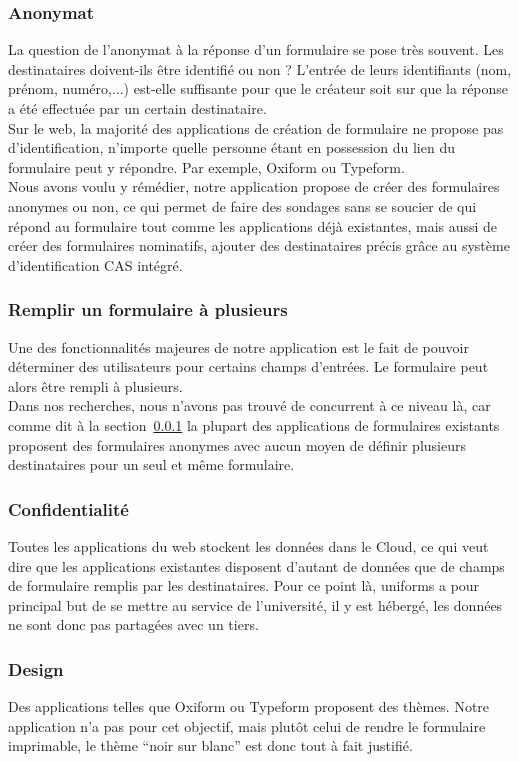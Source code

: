 \documentclass{sigplanconf}
\begin{document}
\subsubsection{Anonymat}\label{sec:anonymat}
La question de l’anonymat à la réponse d’un formulaire se pose très souvent. Les destinataires doivent-ils être identifié ou non ? L’entrée de leurs identifiants (nom, prénom, numéro,...) est-elle suffisante pour que le créateur soit sur que la réponse a été effectuée par un certain destinataire.\\
Sur le web, la majorité des applications de création de formulaire ne propose pas d’identification, n’importe quelle personne étant en possession du lien du formulaire peut y répondre. Par exemple, Oxiform ou Typeform. \\
Nous avons voulu y rémédier, notre application propose de créer des formulaires anonymes ou non, ce qui permet de faire des sondages sans se soucier de qui répond au formulaire tout comme les applications déjà existantes, mais aussi de créer des formulaires nominatifs, ajouter des destinataires précis grâce au système d’identification CAS intégré.
\subsubsection{Remplir un formulaire à plusieurs}
Une des fonctionnalités majeures de notre application est le fait de pouvoir déterminer des utilisateurs pour certains champs d'entrées. Le formulaire peut alors être rempli à plusieurs.\\
Dans nos recherches, nous n'avons pas trouvé de concurrent à ce niveau là, car comme dit à la section~\ref{sec:anonymat} la plupart des applications de formulaires existants proposent des formulaires anonymes avec aucun moyen de définir plusieurs destinataires pour un seul et même formulaire.

\subsubsection{Confidentialité}
Toutes les applications du web stockent les données dans le Cloud, ce qui veut dire que les applications existantes disposent d’autant de données que de champs de formulaire remplis par les destinataires. Pour ce point là, uniforms a pour principal but de se mettre au service de l’université, il y est hébergé, les données ne sont donc pas partagées avec un tiers.
\subsubsection{Design}
Des applications telles que Oxiform ou Typeform proposent des thèmes. Notre application n’a pas pour cet objectif, mais plutôt celui de rendre le formulaire imprimable, le thème “noir sur blanc” est donc tout à fait justifié.
\end{document}
